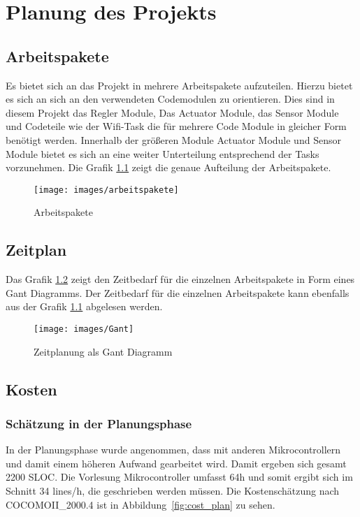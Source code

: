 \chapter{Planung des Projekts}
\label{cha:Planung}

\section{Arbeitspakete}

Es bietet sich an das Projekt in mehrere Arbeitspakete aufzuteilen. Hierzu bietet es sich an sich an den verwendeten Codemodulen zu orientieren. Dies sind in diesem Projekt das Regler Module, Das Actuator Module, das Sensor Module und Codeteile wie der Wifi-Task die für mehrere Code Module in gleicher Form benötigt werden. Innerhalb der größeren Module Actuator Module und Sensor Module bietet es sich an eine weiter Unterteilung entsprechend der Tasks vorzunehmen. Die Grafik \ref{fig:arbeitspakete} zeigt die genaue Aufteilung der Arbeitspakete.

\begin{figure}[hbt]
	\centering
	\texttt{[image: images/arbeitspakete]}
	\caption[Arbeitspakete]{Arbeitspakete}
	\label{fig:arbeitspakete}
\end{figure}

\section{Zeitplan}
Das Grafik \ref{fig:time_plan} zeigt den Zeitbedarf für die einzelnen Arbeitspakete in Form eines Gant Diagramms. Der Zeitbedarf für die einzelnen Arbeitspakete kann ebenfalls aus der Grafik \ref{fig:arbeitspakete} abgelesen werden.

\begin{figure}[hbt]
	\centering
	\texttt{[image: images/Gant]}
	\caption[Zeitplanung als Gant Diagramm]{Zeitplanung als Gant Diagramm}
	\label{fig:time_plan}
\end{figure}


\section{Kosten}

\subsection{Schätzung in der Planungsphase}
In der Planungsphase wurde angenommen, dass mit anderen Mikrocontrollern und damit einem höheren Aufwand gearbeitet wird. Damit ergeben sich gesamt 2200 SLOC. Die Vorlesung Mikrocontroller umfasst 64h und somit ergibt sich im Schnitt 34 lines/h, die geschrieben werden müssen. Die Kostenschätzung nach COCOMOII\_2000.4 ist in Abbildung~\ref{fig:cost_plan} zu sehen.

